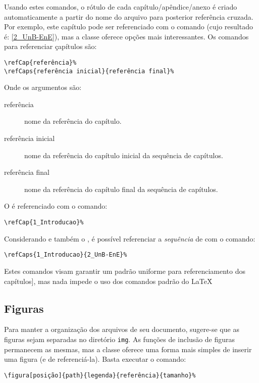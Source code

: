 Usando estes comandos, o rótulo de cada capítulo/apêndice/anexo é criado automaticamente a partir 
do nome do arquivo para posterior referência cruzada. Por exemplo, este capítulo pode ser 
referenciado com o comando  (cujo resultado é: \ref{2_UnB-EnE}), mas 
a classe oferece opções mais interessantes. Os comandos para referenciar çapítulos são:

\begin{verbatim}
\refCap{referência}%
\refCaps{referência inicial}{referência final}%
\end{verbatim}

Onde os argumentos são:
\begin{description}
	\item[referência] nome da referência do capítulo.
	\item[referência inicial] nome da referência do capítulo inicial da sequência de capítulos.
	\item[referência final] nome da referência do capítulo final da sequência de capítulos.
\end{description}

O  é referenciado com o comando:
\begin{verbatim}
\refCap{1_Introducao}%
\end{verbatim}

Considerando  e também o , é possível referenciar a 
\emph{sequência} de  com o comando:
\begin{verbatim}
\refCaps{1_Introducao}{2_UnB-EnE}%
\end{verbatim}

Estes comandos visam garantir um padrão uniforme para referenciamento dos capítulos], mas nada
impede o uso dos comandos padrão do \LaTeX\.

\subsection{Figuras}
Para manter a organização dos arquivos de seu documento, sugere-se que as figuras sejam separadas no
diretório \texttt{img}. As funções de inclusão de figuras permanecem as mesmas, mas a classe 
\unbene oferece uma forma mais simples de inserir uma figura (e de referenciá-la). Basta executar o 
comando:

\begin{verbatim}
\figura[posição]{path}{legenda}{referência}{tamanho}%
\end{verbatim}

